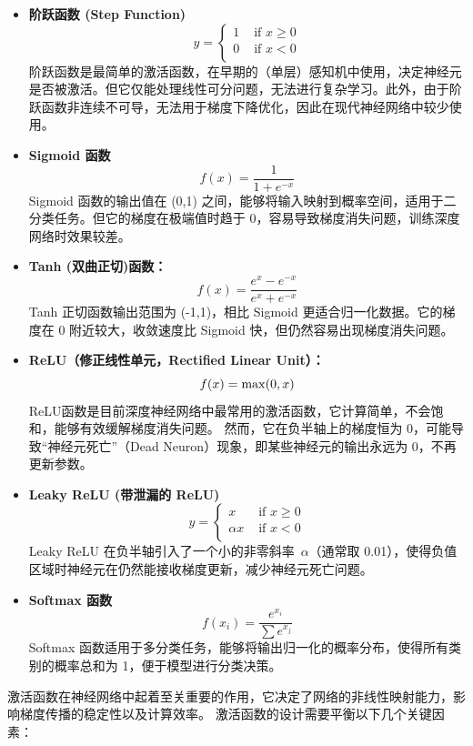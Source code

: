 \begin{itemize}
\item {\bf 阶跃函数 (Step Function)}
\begin{equation*}
y =\left\{ \begin{array}{ll}
1 & \mbox{ if } x\ge 0\\
0 & \mbox{ if } x < 0\\
\end{array}\right.
\end{equation*}
阶跃函数是最简单的激活函数，在早期的（单层）感知机中使用，决定神经元是否被激活。但它仅能处理线性可分问题，无法进行复杂学习。此外，由于阶跃函数非连续不可导，无法用于梯度下降优化，因此在现代神经网络中较少使用。
\item {\bf Sigmoid 函数}
$$
 f(x)= \frac{1}{1+e^{-x}}
 $$
 Sigmoid 函数的输出值在 (0,1) 之间，能够将输入映射到概率空间，适用于二分类任务。但它的梯度在极端值时趋于 0，容易导致梯度消失问题，训练深度网络时效果较差。
\item {\bf Tanh (双曲正切)函数：}
$$f(x) = \frac{e^{x}-e^{-x}}{e^{x}+e^{-x}}$$
Tanh 正切函数输出范围为 (-1,1)，相比 Sigmoid 更适合归一化数据。它的梯度在 0 附近较大，收敛速度比 Sigmoid 快，但仍然容易出现梯度消失问题。
\item {\bf ReLU（修正线性单元，Rectified Linear Unit）：}
$$
f(x)= {\rm max}(0,x)
$$
ReLU函数是目前深度神经网络中最常用的激活函数，它计算简单，不会饱和，能够有效缓解梯度消失问题。
然而，它在负半轴上的梯度恒为 0，可能导致“神经元死亡”（Dead Neuron）现象，即某些神经元的输出永远为 0，不再更新参数。
\item {\bf Leaky ReLU (带泄漏的 ReLU)}
\begin{equation*}
y =\left\{ \begin{array}{ll}
x & \mbox{ if } x\ge 0\\
\alpha x & \mbox{ if } x < 0\\
\end{array}\right.
\end{equation*}
Leaky ReLU 在负半轴引入了一个小的非零斜率~$\alpha$（通常取 0.01），使得负值区域时神经元在仍然能接收梯度更新，减少神经元死亡问题。
\item {\bf Softmax 函数}
$$f(x_i) = \frac{e^{x_i}}{ \sum e^{x_j}}$$
 Softmax 函数适用于多分类任务，能够将输出归一化的概率分布，使得所有类别的概率总和为 1，便于模型进行分类决策。
\end{itemize}
激活函数在神经网络中起着至关重要的作用，它决定了网络的非线性映射能力，影响梯度传播的稳定性以及计算效率。
激活函数的设计需要平衡以下几个关键因素：
